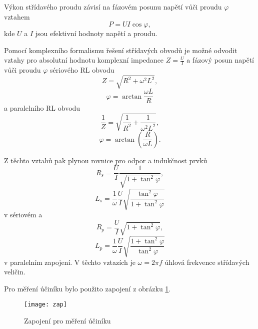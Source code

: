 \documentclass[0-protokol.tex]{subfiles}
\begin{document}
Výkon střídavého proudu závisí na fázovém posunu napětí vůči proudu $\varphi$ vztahem
\begin{equation} \label{eq:vykon}
P = UI \cos \varphi,
\end{equation}
kde $U$ a $I$ jsou efektivní hodnoty napětí a proudu.

Pomocí komplexního formalismu řešení střídavých obvodů je možné odvodit vztahy pro absolutní hodnotu komplexní impedance $Z = \frac{U}{I}$ a fázový posun napětí vůči proudu $\varphi$ sériového RL obvodu
\begin{equation}
Z = \sqrt{R^2 + \omega^2 L^2},
\end{equation}
\begin{equation}
\varphi = \arctan \frac{\omega L}{R}
\end{equation}
a paralelního RL obvodu
\begin{equation}
\frac{1}{Z} = \sqrt{\frac{1}{R^2} + \frac{1}{\omega^2 L^2}},
\end{equation}
\begin{equation}
\varphi = \arctan \left(\frac{R}{\omega L} \right).
\end{equation}

Z těchto vztahů pak plynou rovnice pro odpor a indukčnost prvků
\begin{equation}
R_s = \frac{U}{I}\frac{1}{\sqrt{1 + \tan^2 \varphi}},
\end{equation}
\begin{equation}
L_s = \frac{1}{\omega}\frac{U}{I}\sqrt{\frac{\tan^2 \varphi}{1 + \tan^2 \varphi}}
\end{equation}
v sériovém a
\begin{equation}
R_p = \frac{U}{I}\sqrt{1 + \tan^2 \varphi},
\end{equation}
\begin{equation}
L_p = \frac{1}{\omega}\frac{U}{I}\sqrt{\frac{1 + \tan^2 \varphi}{\tan^2 \varphi}}
\end{equation}
v paralelním zapojení. V těchto vztazích je $\omega = 2 \pi f$ úhlová frekvence střídavých veličin.

Pro měření účiníku bylo použito zapojení z obrázku \ref{fig:zap}.

\begin{figure}[H]
\centering
\texttt{[image: zap]}
\caption{Zapojení pro měření účiníku}
\label{fig:zap}
\end{figure}
\end{document}

